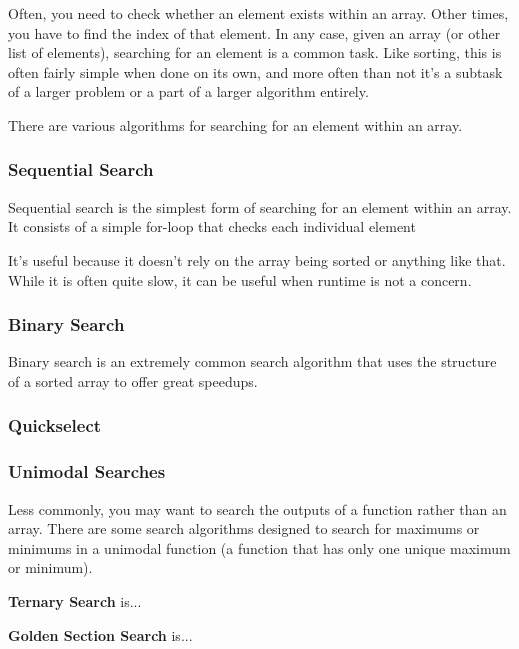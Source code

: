 Often, you need to check whether an element exists within an array. Other times, you have to find the index of that element. In any case, given an array (or other list of elements), searching for an element is a common task. Like sorting, this is often fairly simple when done on its own, and more often than not it's a subtask of a larger problem or a part of a larger algorithm entirely.

There are various algorithms for searching for an element within an array.

\subsubsection{Sequential Search}

Sequential search is the simplest form of searching for an element within an array. It consists of a simple for-loop that checks each individual element 

It's useful because it doesn't rely on the array being sorted or anything like that. While it is often quite slow, it can be useful when runtime is not a concern.

\subsubsection{Binary Search}

Binary search is an extremely common search algorithm that uses the structure of a sorted array to offer great speedups.

\subsubsection{Quickselect}

\subsubsection{Unimodal Searches}

Less commonly, you may want to search the outputs of a function rather than an array. There are some search algorithms designed to search for maximums or minimums in a unimodal function (a function that has only one unique maximum or minimum).

\textbf{Ternary Search} is...

\textbf{Golden Section Search} is...